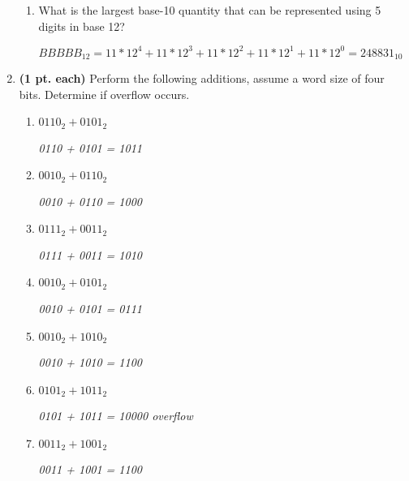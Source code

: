 \begin{enumerate}
\begin{enumerate}
	\item What is the largest base-10 quantity that can be represented
	using 5 digits in base 12?

	\begin{onlysolution}
	\itshape $BBBBB_{12} = 11*12^4+11*12^3+11*12^2+11*12^1+11*12^0=248831_{10}$ \end{onlysolution}
	
	\end{enumerate}


\item \textbf{ (1 pt. each)} Perform the following additions, assume a word 
size of four bits. Determine if overflow occurs.
	\begin{enumerate}
	
	\item $0110_2 + 0101_2$
	\begin{onlysolution}	\itshape0110 + 0101 = 1011\end{onlysolution}
	
	\item $0010_2 + 0110_2$
	\begin{onlysolution}	\itshape0010 + 0110 = 1000\end{onlysolution}
	
	\item $0111_2 + 0011_2$
	\begin{onlysolution}	\itshape0111 + 0011 = 1010\end{onlysolution}
	
	\item $0010_2 + 0101_2$
	\begin{onlysolution}	\itshape0010 + 0101 = 0111\end{onlysolution}
	
	\item $0010_2 + 1010_2$
	\begin{onlysolution}	\itshape0010 + 1010 = 1100\end{onlysolution}
	
	\item $0101_2 + 1011_2$
	\begin{onlysolution}	\itshape0101 + 1011 = 10000 overflow\end{onlysolution}
	
	\item $0011_2 + 1001_2$
	\begin{onlysolution}	\itshape0011 + 1001 = 1100\end{onlysolution}
	
	\end{enumerate}
\end{enumerate}
